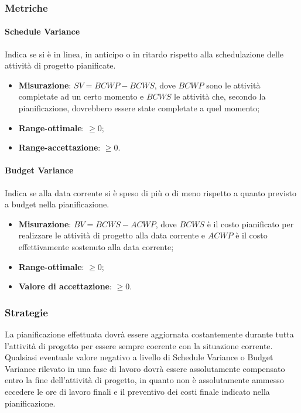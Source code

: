 \subsubsection{Metriche}
\paragraph{Schedule Variance}
\label{scheduleVariance}
Indica se si è in linea, in anticipo o in ritardo rispetto alla schedulazione delle attività di progetto pianificate.
\begin{itemize}
\item \textbf{Misurazione}: $SV = BCWP - BCWS$, dove $BCWP$ sono le attività completate ad un certo momento e $BCWS$ le attività che, secondo la pianificazione, dovrebbero essere state completate a quel momento;
\item \textbf{Range-ottimale}: $\geq 0$;
\item \textbf{Range-accettazione}: $\geq 0$.
\end{itemize}
\paragraph{Budget Variance}
\label{budgetVariance}
Indica se alla data corrente si è speso di più o di meno rispetto a quanto previsto a budget nella pianificazione.
\begin{itemize}
\item \textbf{Misurazione}: $BV = BCWS - ACWP$, dove $BCWS$ è il costo pianificato per realizzare le attività di progetto alla data corrente e $ACWP$ è il costo effettivamente sostenuto alla data corrente;
\item \textbf{Range-ottimale}: $\geq 0$;
\item \textbf{Valore di accettazione}: $\geq 0$.
\end{itemize}
\subsubsection{Strategie}
La pianificazione effettuata dovrà essere aggiornata costantemente durante tutta l'attività di progetto per essere sempre coerente con la situazione corrente.\\
Qualsiasi eventuale valore negativo a livello di Schedule Variance o  Budget Variance rilevato in una fase di lavoro dovrà essere assolutamente compensato entro la fine dell'attività di progetto, in quanto non è assolutamente ammesso eccedere le ore di lavoro finali e il preventivo dei costi finale indicato nella pianificazione.
